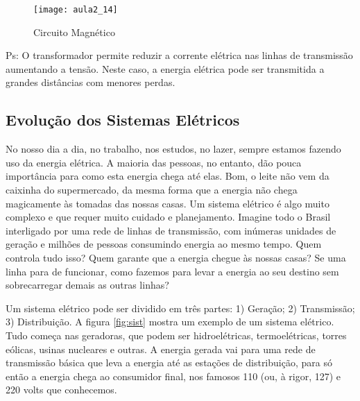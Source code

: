 \begin{figure}[H]
\begin{centering}
\texttt{[image: aula2\_14]}\protect\caption{\label{fig:aula2_14}Circuito Magnético}
\end{centering}
\end{figure}

Ps: O transformador permite reduzir a corrente elétrica nas linhas
de transmissão aumentando a tensão. Neste caso, a energia elétrica
pode ser transmitida a grandes distâncias com menores perdas. 







\subsection{Evolução dos Sistemas Elétricos}


No nosso dia a dia, no trabalho, nos estudos, no lazer, sempre estamos fazendo uso da energia elétrica. A maioria das pessoas, no entanto, dão pouca importância para como esta energia chega até elas. Bom, o leite não vem da caixinha do supermercado, da mesma forma que a energia não chega magicamente às tomadas das nossas casas. Um sistema elétrico é algo muito complexo e que requer muito cuidado e planejamento. Imagine todo o Brasil interligado por uma rede de linhas de transmissão, com inúmeras unidades de geração e milhões de pessoas consumindo energia ao mesmo tempo. Quem controla tudo isso? Quem garante que a energia chegue às nossas casas? Se uma linha para de funcionar, como fazemos para levar a energia ao seu destino sem sobrecarregar demais as outras linhas?


Um sistema elétrico pode ser dividido em três partes: 1) Geração; 2) Transmissão; 3) Distribuição. A figura \ref{fig:sist} mostra um exemplo de um sistema elétrico. Tudo começa nas geradoras, que podem ser hidroelétricas, termoelétricas, torres eólicas, usinas nucleares e outras. A energia gerada vai para uma rede de transmissão básica que leva a energia até as estações de distribuição, para só então a energia chega ao consumidor final, nos famosos 110 (ou, à rigor, 127) e 220 volts que conhecemos. 

